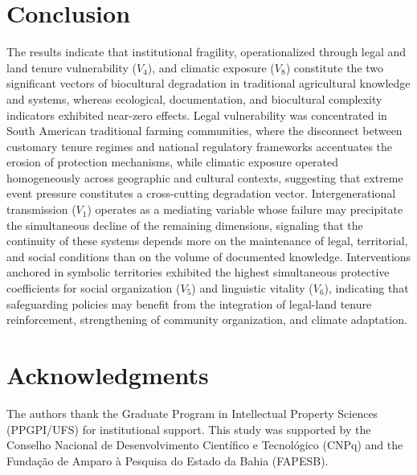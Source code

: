 \documentclass[12pt,a4paper]{article}
\begin{document}
\section{Conclusion}
\label{sec:conclusions}

The results indicate that institutional fragility, operationalized through legal and land tenure vulnerability ($V_4$), and climatic exposure ($V_8$) constitute the two significant vectors of biocultural degradation in traditional agricultural knowledge and systems, whereas ecological, documentation, and biocultural complexity indicators exhibited near-zero effects. Legal vulnerability was concentrated in South American traditional farming communities, where the disconnect between customary tenure regimes and national regulatory frameworks accentuates the erosion of protection mechanisms, while climatic exposure operated homogeneously across geographic and cultural contexts, suggesting that extreme event pressure constitutes a cross-cutting degradation vector. Intergenerational transmission ($V_1$) operates as a mediating variable whose failure may precipitate the simultaneous decline of the remaining dimensions, signaling that the continuity of these systems depends more on the maintenance of legal, territorial, and social conditions than on the volume of documented knowledge. Interventions anchored in symbolic territories exhibited the highest simultaneous protective coefficients for social organization ($V_5$) and linguistic vitality ($V_6$), indicating that safeguarding policies may benefit from the integration of legal-land tenure reinforcement, strengthening of community organization, and climate adaptation.

\section*{Acknowledgments}

The authors thank the Graduate Program in Intellectual Property Sciences (PPGPI/UFS) for institutional support. This study was supported by the Conselho Nacional de Desenvolvimento Cient\'{i}fico e Tecnol\'{o}gico (CNPq) and the Funda\c{c}\~{a}o de Amparo \`{a} Pesquisa do Estado da Bahia (FAPESB).


\end{document}
